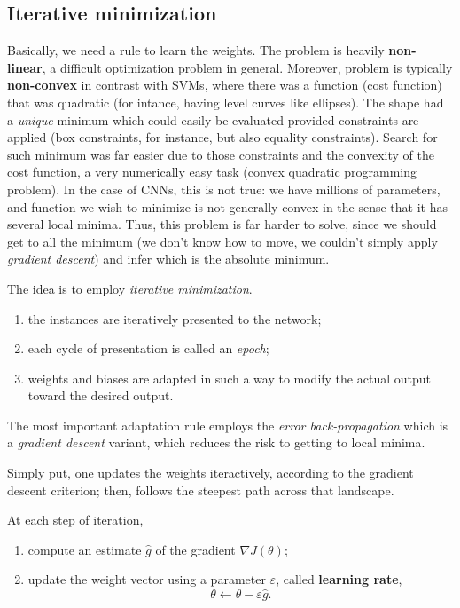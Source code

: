 \documentclass[10pt]{report}
\begin{document}
\subsection{Iterative minimization}
\label{iterative-minimization}
Basically, we need a rule to learn the weights. The problem is heavily
\textbf{non-linear}, a difficult optimization problem in general. Moreover,
problem is typically \textbf{non-convex} in contrast with SVMs, where there was
a function (cost function) that was quadratic (for intance, having level
curves like ellipses). The shape had a \emph{unique} minimum which could
easily be evaluated provided constraints are applied (box constraints,
for instance, but also equality constraints). Search for such minimum
was far easier due to those constraints and the convexity of the cost
function, a very numerically easy task (convex quadratic programming
problem). In the case of CNNs, this is not true: we have millions of
parameters, and function we wish to minimize is not generally convex in
the sense that it has several local minima. Thus, this problem is far
harder to solve, since we should get to all the minimum (we don't know
how to move, we couldn't simply apply \emph{gradient descent}) and infer
which is the absolute minimum.

The idea is to employ \emph{iterative minimization}.

\begin{enumerate}
\item the instances are iteratively presented to the network;
\item each cycle of presentation is called an \emph{epoch};
\item weights and biases are adapted in such a way to modify the actual
output toward the desired output.
\end{enumerate}

The most important adaptation rule employs the \emph{error back-propagation}
which is a \emph{gradient descent} variant, which reduces the risk to getting
to local minima.

Simply put, one updates the weights iteractively, according to the gradient descent criterion; then, follows the steepest path across that landscape.

At each step of iteration,

\begin{enumerate}
\item compute an estimate \(\hat{g}\) of the gradient \(\nabla J(\theta)\);
\item update the weight vector using a parameter \(\varepsilon\), called
\textbf{learning rate}, \[\theta \leftarrow \theta - \varepsilon \hat{g}.\]
\end{enumerate}
\end{document}
